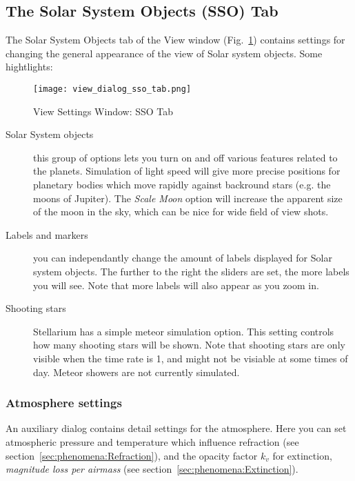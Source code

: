 \subsection{The Solar System Objects (SSO) Tab}
\label{sec:gui:view:sso}

The Solar System Objects tab of the View window (Fig.~\ref{fig:gui:view:sso}) contains settings
for changing the general appearance of the view of Solar system objects. Some hightlights:

\begin{figure}[htbp]
\centering\texttt{[image: view\_dialog\_sso\_tab.png]}
\caption{View Settings Window: SSO Tab}
\label{fig:gui:view:sso}
\end{figure}


\begin{description}
\item[Solar System objects] this group of options lets you turn on
  and off various features related to the planets. Simulation of light
  speed will give more precise positions for planetary bodies which move
  rapidly against backround stars (e.g. the moons of Jupiter). The
  \emph{Scale Moon} option will increase the apparent size of the moon
  in the sky, which can be nice for wide field of view shots.
\item[Labels and markers] you can independantly change the amount of
  labels displayed for Solar system objects. The further to the
  right the sliders are set, the more labels you will see. Note that
  more labels will also appear as you zoom in.
\item[Shooting stars] Stellarium has a simple meteor simulation
  option. This setting controls how many shooting stars will be shown.
  Note that shooting stars are only visible when the time rate is 1, and
  might not be visiable at some times of day. Meteor showers are not
  currently simulated.
\end{description}

\subsubsection{Atmosphere settings}
\label{sec:gui:view:sky:atmosphere}

An auxiliary dialog contains detail settings for the atmosphere. Here
you can set atmospheric pressure and temperature which influence
refraction (see section~\ref{sec:phenomena:Refraction}), and the
opacity factor $k_v$ for extinction, \emph{magnitude loss per airmass} 
(see section~\ref{sec:phenomena:Extinction}).


